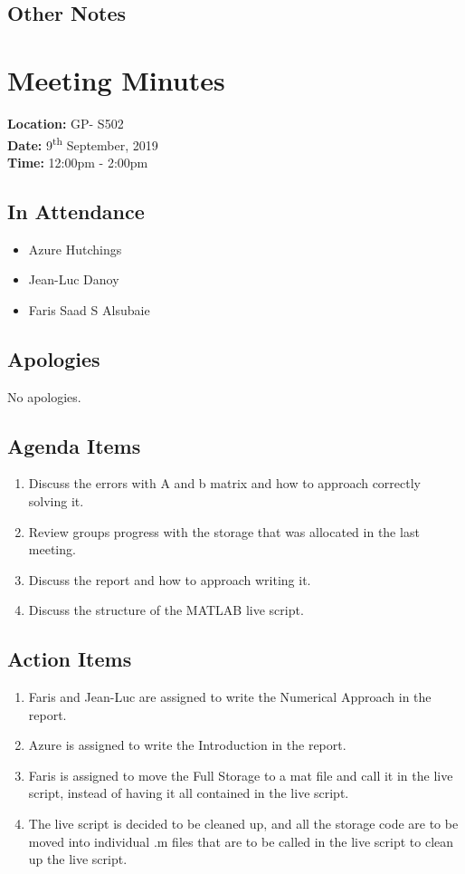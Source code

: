 \documentclass{article}
\begin{document}
\subsection*{Other Notes}

\pagebreak

\section{Meeting Minutes}
\textbf{Location:} GP- S502 \\
\textbf{Date:} 9\textsuperscript{th} September, 2019 \\
\textbf{Time:} 12:00pm - 2:00pm

\subsection*{In Attendance}
\begin{itemize}
\item Azure Hutchings
\item Jean-Luc Danoy
\item Faris Saad S Alsubaie
\end{itemize}

\subsection*{Apologies}
No apologies. 

\subsection*{Agenda Items}
\begin{enumerate}
\item Discuss the errors with A and b matrix and how to approach correctly solving it.
\item Review groups progress with the storage that was allocated in the last meeting.
\item Discuss the report and how to approach writing it. 
\item Discuss the structure of the MATLAB live script.
\end{enumerate}

\subsection*{Action Items}
\begin{enumerate}
\item Faris and Jean-Luc are assigned to write the Numerical Approach in the report.
\item Azure is assigned to write the Introduction in the report.
\item Faris is assigned to move the Full Storage to a mat file and call it in the live script, instead of having it all contained in the live script.
\item The live script is decided to be cleaned up, and all the storage code are to be moved into individual .m files that are to be called in the live script to clean up the live script.
\end{enumerate}
\end{document}
